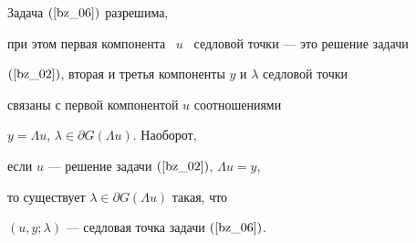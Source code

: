 \begin{thm} \label{bz_T1}


Задача $(\ref{bz_06})$ разрешима,


при этом первая компонента \ $u$ \ седловой точки --- это решение задачи 


$(\ref{bz_02})$, вторая и третья компоненты $y$ и $\lambda$ седловой точки 


связаны с первой компонентой $u$ соотношениями 


$y=\Lambda u$, $\lambda \in \partial G(\Lambda u)$. Наоборот, 


если $u$ --- решение задачи $(\ref{bz_02})$, $\Lambda u=y$, 


то существует $\lambda \in \partial G(\Lambda u)$ такая, что 


$(u, y; \lambda)$ --- седловая точка задачи $(\ref{bz_06})$.


\end{thm}





